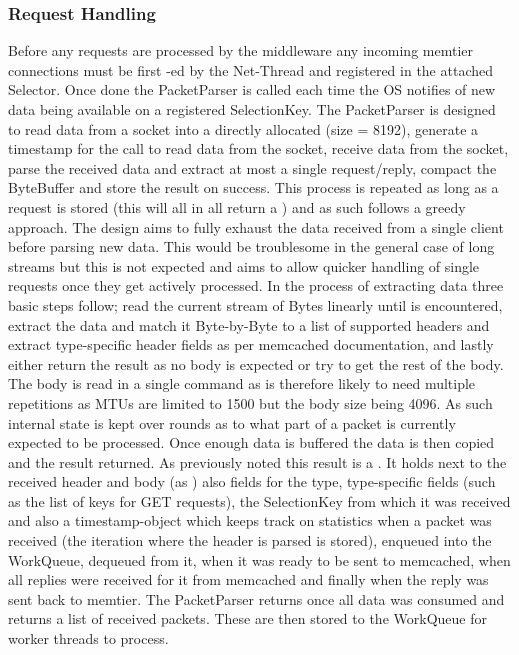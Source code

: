     \subsubsection{Request Handling}
        Before any requests are processed by the middleware any incoming memtier connections must be first
        -ed by the Net-Thread and registered in the attached Selector. Once done the PacketParser is called
        each time the OS notifies of new data being available on a registered SelectionKey. The PacketParser is designed
        to read data from a socket into a directly allocated  (size = \SI{8192}{\byte}), generate a
        timestamp for the call to read data from the socket, receive data from the socket, parse the received data and
        extract at most a single request/reply, compact the ByteBuffer and store the result on success. This process is
        repeated as long as a request is stored (this will all in all return a ) and as such follows a greedy
        approach. The design aims to fully exhaust the data received from a single client before parsing new data. This
        would be troublesome in the general case of long streams but this is not expected and aims to allow quicker
        handling of single requests once they get actively processed. In the process of extracting data three basic
        steps follow; read the current stream of Bytes linearly until  is
        encountered, extract the data and match it Byte-by-Byte to a list of supported headers and extract type-specific
        header fields as per memcached documentation, and lastly either return the result as no body is expected or try
        to get the rest of the body.  The body is read in a single command as is therefore likely to need multiple
        repetitions as MTUs are limited to \SI{1500}{\byte} but the body size being \SI{4096}{\byte}. As such internal
        state is kept over rounds as to what part of a packet is currently expected to be processed. Once enough data is
        buffered the data is then copied and the result returned. As previously noted this result is a . It
        holds next to the received header and body (as ) also fields for the type, type-specific fields (such
        as the list of keys for GET requests), the SelectionKey from which it was received and also a timestamp-object
        which keeps track on statistics when a packet was received (the iteration where the header is parsed is stored),
        enqueued into the WorkQueue, dequeued from it, when it was ready to be sent to memcached, when all replies were
        received for it from memcached and finally when the reply was sent back to memtier.\newline
        The PacketParser returns once all data was consumed and returns a list of received packets. These are then
        stored to the WorkQueue for worker threads to process.

